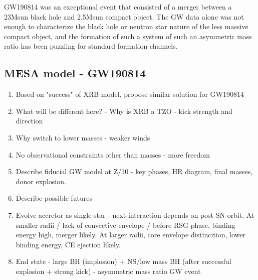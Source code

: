 \documentclass[linenumbers,trackchanges,twocolumn]{aastex701}
\begin{document}
GW190814 was an exceptional event that consisted of a merger between a 23Msun black hole and 2.5Msun compact object. The GW data alone was not enough to characterize the black hole or neutron star nature of the less massive compact object, and the formation of such a system of such an asymmetric mass ratio has been puzzling for standard formation channels. 

\subsection{MESA model - GW190814}

\begin{enumerate}
    \item Based on "success" of XRB model, propose similar solution for GW190814
    \item What will be different here? - Why is XRB a TZO - kick strength and direction
    \item Why switch to lower masses - weaker winds
    \item No observational constraints other than masses - more freedom
    \item Describe fiducial GW model at Z/10 - key phases, HR diagram, final masses, donor explosion.
    \item Describe possible futures
    \item Evolve accretor as single star - next interaction depends on post-SN orbit. At smaller radii / lack of convective envelope / before RSG phase, binding energy high, merger likely. At larger radii, core envelope distincition, lower binding energy, CE ejection likely.
    \item End state - large BH (implosion) + NS/low mass BH (after successful explosion + strong kick) - asymmetric mass ratio GW event
\end{enumerate}
\end{document}
